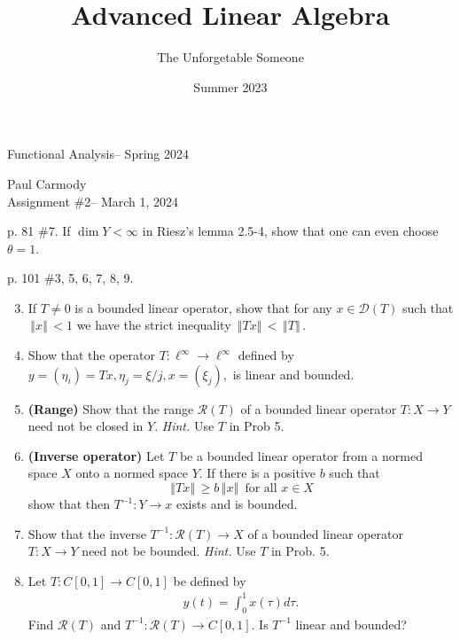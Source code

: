 \documentclass[10pt,a4paper]{report}
\title{Advanced Linear Algebra}
\author{The Unforgetable Someone}
\date{Summer 2023}
\newcommand{\CLASSNAME}{Functional Analysis}
\newcommand{\STUDENTNAME}{Paul Carmody}
\newcommand{\ASSIGNMENT}{Assignment \#2}
\newcommand{\DUEDATE}{March 1, 2024}
\newcommand{\SEMESTER}{Spring 2024}
\newcommand{\NORM}[1]{\,\left \Vert #1 \right \Vert\,}
\begin{document}
\begin{center}
	\Large{\CLASSNAME -- \SEMESTER} \\
\end{center}
\begin{center}
	\STUDENTNAME \\
	\ASSIGNMENT -- \DUEDATE\\
\end{center} 
\vskip 0.5cm
p. 81 \#7.  If $\dim Y < \infty$ in Riesz's lemma 2.5-4, show that one can even choose $\theta = 1$.

\newpage
 p. 101 \#3, 5, 6, 7, 8, 9. 
\begin{enumerate}
	\setcounter{enumi}{2}
	\item If $T \ne 0$ is a bounded linear operator, show that for any $x \in \mathcal{D}(T)$ such that $\NORM{x} < 1$ we have the strict inequality $\NORM{Tx} < \NORM{T}$.
	
	\setcounter{enumi}{4}
	\item Show that the operator $T: \ell^\infty \to \ell^\infty$ defined by $y = (\eta_i)=Tx, \eta_j=\xi/j, x=(\xi_j),$ is linear and bounded.
	\item \textbf{(Range)} Show that the range $\mathcal{R}(T)$ of a bounded linear operator $T: X\to Y$ need not be closed in $Y$.  \textit{Hint.} Use $T$ in Prob 5.
	\item \textbf{(Inverse operator)} Let $T$ be a bounded linear operator from a normed space $X$ onto a normed space $Y$.  If there is a positive $b$ such that $$ \NORM{Tx}\ge b\NORM{x} \text{ for all } x \in X$$ show that then $T^{-1}:Y\to x$ exists and is bounded.
	\item Show that the inverse $T^{-1}:\mathcal{R}(T)\to X$ of a bounded linear operator $T:X\to Y$ need not be bounded.  \textit{Hint.}  Use $T$ in Prob. 5.
	\item Let $T: C[0,1] \to C[0,1]$ be defined by 
	\begin{align*}
		y(t) = \int_0^1 x(\tau) d\tau.
	\end{align*}Find $\mathcal{R}(T)$ and $T^{-1}:\mathcal{R}(T)\to C[0,1]$.  Is $T^{-1}$ linear and bounded?
\end{enumerate}
\newpage 
\end{document}
